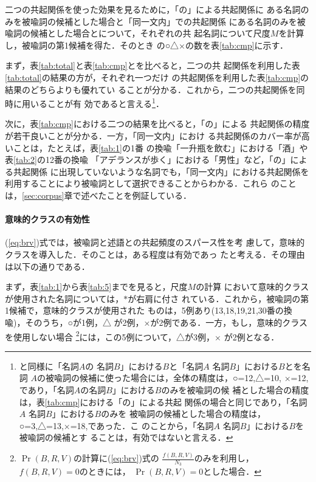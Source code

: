 二つの共起関係を使った効果を見るために，「の」による共起関係に
ある名詞のみを被喩詞の候補とした場合と「同一文内」での共起関係
にある名詞のみを被喩詞の候補とした場合とについて，それぞれの共
起名詞について尺度$M$を計算し，被喩詞の第1候補を得た．そのとき
の○△×の数を表\ref{tab:cmp}に示す．

まず，表\ref{tab:total}と表\ref{tab:cmp}とを比べると，二つの共
起関係を利用した表\ref{tab:total}の結果の方が，それぞれ一つだけ
の共起関係を利用した表\ref{tab:cmp}の結果のどちらよりも優れてい
ることが分かる．これから，二つの共起関係を同時に用いることが有
効であると言える\footnote{\cite{yamamoto98}と同様に「名詞$A$の
  名詞$B$」における$B$と「名詞$A$ 名詞$B$」における$B$とを名詞
  $A$の被喩詞の候補に使った場合には，全体の精度は，○=12,△=10,
  ×=12,であり，「名詞$A$の名詞$B$」における$B$のみを被喩詞の候
  補とした場合の精度は，表\ref{tab:cmp}における「の」による共起
  関係の場合と同じであり，「名詞$A$ 名詞$B$」における$B$のみを
  被喩詞の候補とした場合の精度は，○=3,△=13,×=18,であった．こ
  のことから，「名詞$A$ 名詞$B$」における$B$を被喩詞の候補とす
  ることは，有効ではないと言える．}．

次に，表\ref{tab:cmp}における二つの結果を比べると，「の」による
共起関係の精度が若干良いことが分かる．一方，「同一文内」におけ
る共起関係のカバー率が高いことは，たとえば，表\ref{tab:1}の1番
の換喩「一升瓶を飲む」における「酒」や表\ref{tab:2}の12番の換喩
「アデランスが歩く」における「男性」など，「の」による共起関係
に出現していないような名詞でも，「同一文内」における共起関係を
利用することにより被喩詞として選択できることからわかる．これら
のことは，\ref{sec:corpus}章で述べたことを例証している．
\vspace{-3mm}
\paragraph{意味的クラスの有効性}

(\ref{eq:brv})式では，被喩詞と述語との共起頻度のスパース性を考
慮して，意味的クラスを導入した．そのことは，ある程度は有効であっ
たと考える．その理由は以下の通りである．

まず，表\ref{tab:1}から表\ref{tab:5}までを見ると，尺度$M$の計算
において意味的クラスが使用された名詞については，$*$が右肩に付さ
れている．これから，被喩詞の第1候補で，意味的クラスが使用された
ものは，5例あり(13,18,19,21,30番の換喩)，そのうち，○が1例，△
が2例，×が2例である．一方，もし，意味的クラスを使用しない場合
\footnote{$\Pr(B,R,V)$の計算に(\ref{eq:brv})式の
  $\frac{f(B,R,V)}{N_3}$のみを利用し，$f(B,R,V)=0$のときには，
  $\Pr(B,R,V)=0$とした場合．}には，この5例について，△が3例，×
が2例となる．

